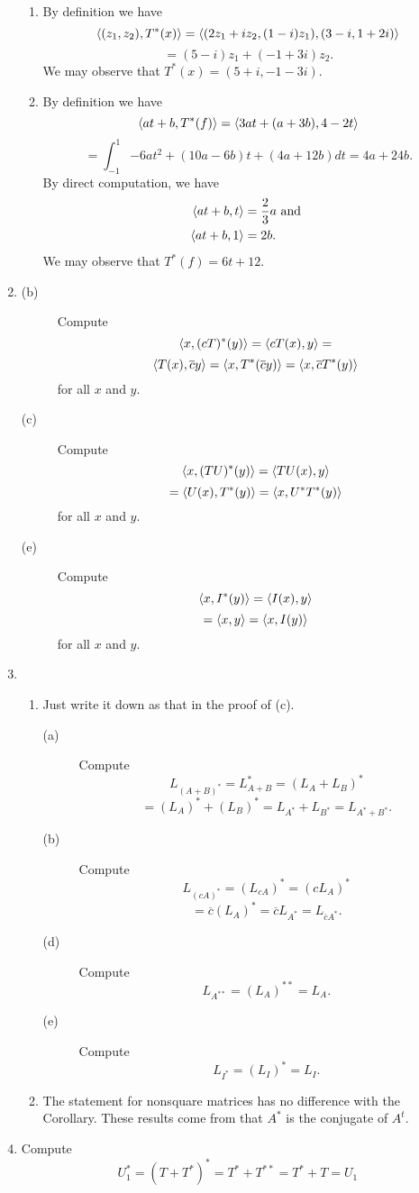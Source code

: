 \begin{enumerate}
\begin{enumerate}
\item By definition we have 
\[\langle (z_1,z_2),T^*(x)\rangle =\langle (2z_1+iz_2,(1-i)z_1),(3-i,1+2i)\rangle \]
\[=(5-i)z_1+(-1+3i)z_2.\]
We may observe that $T^*(x)=(5+i,-1-3i)$.
\item By definition we have 
\[\langle at+b,T^*(f)\rangle =\langle 3at+(a+3b),4-2t\rangle \]
\[=\int_{-1}^1{-6at^2+(10a-6b)t+(4a+12b)dt} = 4a + 24b.\]
By direct computation, we have  
\[\begin{aligned}
    \langle at + b, t\rangle &= \frac{2}{3}a \text{ and } \\
    \langle at + b, 1\rangle &= 2b.
\end{aligned}\]
We may observe that $T^*(f) = 6t+12$.
\end{enumerate}
\item \begin{description}
\item[(b)] Compute 
\[\langle x,(cT)^*(y)\rangle =\langle cT(x),y\rangle =\]
\[\langle T(x),\overline{c}y\rangle =\langle x,T^*(\overline{c}y)\rangle =\langle x,\overline{c}T^*(y)\rangle \]
for all $x$ and $y$.
\item[(c)] Compute 
\[\langle x,(TU)^*(y)\rangle =\langle TU(x),y\rangle \]
\[=\langle U(x),T^*(y)\rangle =\langle x,U^*T^*(y)\rangle \]
for all $x$ and $y$.
\item[(e)] Compute 
\[\langle x,I^*(y)\rangle =\langle I(x),y\rangle \]
\[=\langle x,y\rangle =\langle x,I(y)\rangle \]
for all $x$ and $y$.
\end{description}
\item \begin{enumerate}
\item Just write it down as that in the proof of (c).
\begin{description}
\item[(a)] Compute 
\[L_{(A+B)^*}=L_{A+B}^*=(L_A+L_B)^*\]
\[=(L_A)^*+(L_B)^*=L_{A^*}+L_{B^*}=L_{A^*+B^*}.\]
\item[(b)] Compute 
\[L_{(cA)^*}=(L_{cA})^*=(cL_A)^*\]
\[=\overline{c}(L_A)^*=\overline{c}L_{A^*}=L_{\overline{c}A^*}.\]
\item[(d)] Compute 
\[L_{A^{**}}=(L_A)^{**}=L_A.\]
\item[(e)] Compute 
\[L_{I^*}=(L_I)^*=L_I.\]
\end{description}
\item The statement for nonsquare matrices has no difference with the Corollary.  These results come from that $A^*$ is the conjugate of $A^t$.
\end{enumerate}
\item Compute 
\[U_1^*=(T+T^*)^*=T^*+T^{**}=T^*+T=U_1\]

\end{enumerate}
